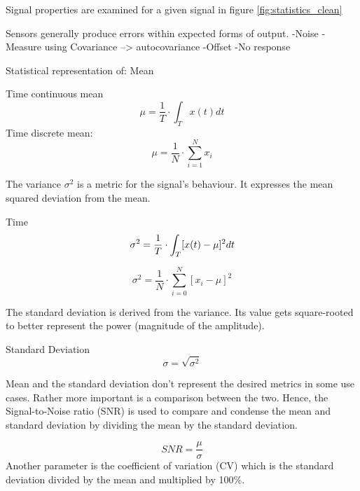 Signal properties are examined for a given signal in figure \ref{fig:statistics_clean}





Sensors generally produce errors within expected forms of output.
-Noise
-Measure using Covariance --> autocovariance
-Offset
-No response

Statistical representation of:
Mean

\cite[S.13-17]{smith_scientist_nodate}

Time continuous mean
\begin{equation}
    \label{eq:mean_cont}
    \mu=\frac{1}{T} \cdot \int_T x(t) d t
\end{equation}
Time discrete mean:
\begin{equation}
    \label{eq:mean_disc}
    \mu=\frac{1}{N} \cdot \sum_{i=1}^{N} x_i
\end{equation}




The variance $\sigma^2$ is a metric for the signal's behaviour. It expresses the mean squared deviation from the mean.

Time
\begin{equation}
    \label{eq:var_cont}
    \sigma^2=\frac{1}{T} \cdot \int_T[x(t)-\mu]^2 d t\\
\end{equation}

\begin{equation}
    \label{eq:var_disc}
    \sigma^2=\frac{1}{N} \cdot \sum_{i=0}^{N}\left[x_i-\mu\right]^2
\end{equation}

The standard deviation is derived from the variance. Its value gets square-rooted to better represent the power (magnitude of the amplitude).

Standard Deviation
\begin{equation}
    \label{eq:stdev_disc}
    \sigma = \sqrt{\sigma^2}
\end{equation}

Mean and the standard deviation don't represent the desired metrics in some use cases. Rather more important is a comparison between the two. Hence, the Signal-to-Noise ratio (SNR) is used to compare and condense the mean and standard deviation by dividing the mean by the standard deviation.

\begin{equation}
    \label{eq:snr}
    SNR=\frac{\mu}{\sigma}
\end{equation}
Another parameter is the coefficient of variation (CV) which is the standard deviation divided by the mean and multiplied by 100\%.

